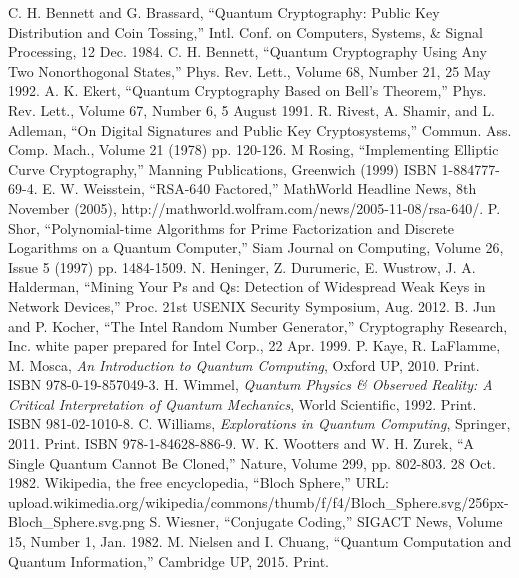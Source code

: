\documentclass[conference]{IEEEtran}
\begin{document}
\begin{thebibliography}{26}
  C. H. Bennett and G. Brassard, ``Quantum Cryptography: Public Key Distribution and Coin Tossing,'' Intl. Conf. on Computers, Systems, \& Signal Processing, 12 Dec. 1984.
  C. H. Bennett, ``Quantum Cryptography Using Any Two Nonorthogonal States,'' Phys. Rev. Lett., Volume 68, Number 21, 25 May 1992.
  A. K. Ekert, ``Quantum Cryptography Based on Bell's Theorem,'' Phys. Rev. Lett., Volume 67, Number 6, 5 August 1991.
  R. Rivest, A. Shamir, and L. Adleman, ``On Digital Signatures and Public Key Cryptosystems,'' Commun. Ass. Comp. Mach., Volume 21 (1978) pp. 120-126.
  M Rosing, ``Implementing Elliptic Curve Cryptography,'' Manning Publications, Greenwich (1999) ISBN 1-884777-69-4.
  E. W. Weisstein, ``RSA-640 Factored,'' MathWorld Headline News, 8th November (2005),
  http://mathworld.wolfram.com/news/2005-11-08/rsa-640/.
  P. Shor, ``Polynomial-time Algorithms for Prime Factorization and Discrete Logarithms on a Quantum Computer,'' Siam Journal on Computing, Volume 26, Issue 5 (1997) pp. 1484-1509.
  N. Heninger, Z. Durumeric, E. Wustrow, J. A. Halderman, ``Mining Your Ps and Qs: Detection of Widespread Weak Keys in Network Devices,'' Proc. 21st USENIX Security Symposium, Aug. 2012.
  B. Jun and P. Kocher, ``The Intel Random Number Generator,'' Cryptography Research, Inc. white paper prepared for Intel Corp., 22 Apr. 1999.
  P. Kaye, R. LaFlamme, M. Mosca, \textit{An Introduction to Quantum Computing}, Oxford UP, 2010. Print. ISBN 978-0-19-857049-3.
  H. Wimmel, \textit{Quantum Physics \& Observed Reality: A Critical Interpretation of Quantum Mechanics}, World Scientific, 1992. Print. ISBN 981-02-1010-8.
  C. Williams, \textit{Explorations in Quantum Computing}, Springer, 2011. Print. ISBN 978-1-84628-886-9.
  W. K. Wootters and W. H. Zurek, ``A Single Quantum Cannot Be Cloned,'' Nature, Volume 299, pp. 802-803. 28 Oct. 1982.
  Wikipedia, the free encyclopedia, ``Bloch Sphere,''
  URL: upload.wikimedia.org/wikipedia/commons/thumb/f/f4/Bloch\_Sphere.svg/256px-Bloch\_Sphere.svg.png
  S. Wiesner, ``Conjugate Coding,'' SIGACT News, Volume 15, Number 1, Jan. 1982.
  M. Nielsen and I. Chuang, ``Quantum Computation and Quantum Information,'' Cambridge UP, 2015. Print.

\end{thebibliography}
\end{document}
